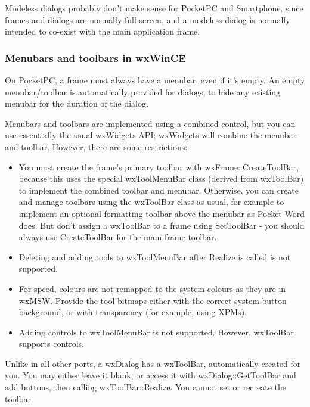 Modeless dialogs probably don't make sense for PocketPC and Smartphone, since
frames and dialogs are normally full-screen, and a modeless dialog is normally
intended to co-exist with the main application frame.

\subsubsection{Menubars and toolbars in wxWinCE}


On PocketPC, a frame must always have a menubar, even if it's empty.
An empty menubar/toolbar is automatically provided for dialogs, to hide
any existing menubar for the duration of the dialog.

Menubars and toolbars are implemented using a combined control,
but you can use essentially the usual wxWidgets API; wxWidgets will combine the menubar
and toolbar. However, there are some restrictions:

\itemsep=0pt
\begin{itemize}
\item You must create the frame's primary toolbar with wxFrame::CreateToolBar,
because this uses the special wxToolMenuBar class (derived from wxToolBar)
to implement the combined toolbar and menubar. Otherwise, you can create and manage toolbars
using the wxToolBar class as usual, for example to implement an optional
formatting toolbar above the menubar as Pocket Word does. But don't assign
a wxToolBar to a frame using SetToolBar - you should always use CreateToolBar
for the main frame toolbar.
\item Deleting and adding tools to wxToolMenuBar after Realize is called is not supported.
\item For speed, colours are not remapped to the system colours as they are
in wxMSW. Provide the tool bitmaps either with the correct system button background,
or with transparency (for example, using XPMs).
\item Adding controls to wxToolMenuBar is not supported. However, wxToolBar supports
controls.
\end{itemize}

Unlike in all other ports, a wxDialog has a wxToolBar, automatically created
for you. You may either leave it blank, or access it with wxDialog::GetToolBar
and add buttons, then calling wxToolBar::Realize. You cannot set or recreate
the toolbar.


